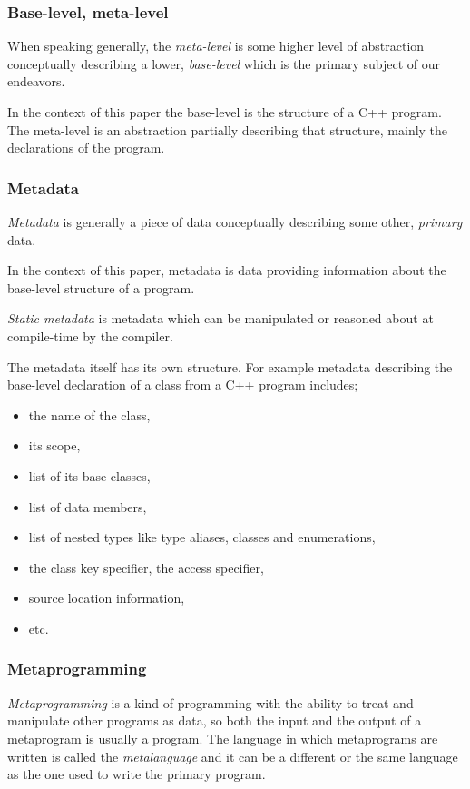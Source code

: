 \subsubsection{Base-level, meta-level}
\label{term-base-meta-level}

When speaking generally, the {\em meta-level} is some higher level of abstraction
conceptually describing a lower, {\em base-level} which is the primary subject
of our endeavors.

In the context of this paper the base-level is the structure of a C++ program.
The meta-level is an abstraction partially describing that structure,
mainly the declarations of the program.

\subsubsection{Metadata}
\label{term-metadata}

{\em Metadata} is generally a piece of data conceptually describing some other,
{\em primary} data.

In the context of this paper, metadata is data providing information
about the base-level structure of a program.

{\em Static metadata} is metadata which can be manipulated or reasoned
about at compile-time by the compiler.

The metadata itself has its own structure.
For example metadata describing the base-level declaration of a class 
from a C++ program includes;
\begin{itemize}
\item the name of the class,
\item its scope,
\item list of its base classes,
\item list of data members,
\item list of nested types like type aliases, classes and enumerations,
\item the class key specifier, the access specifier,
\item source location information,
\item etc.
\end{itemize}

\subsubsection{Metaprogramming}

{\em Metaprogramming} is a kind of programming with the ability to treat and
manipulate other programs as data, so both the input and the output of
a metaprogram is usually a program. The language in which metaprograms
are written is called the {\em metalanguage} and it can be a different or the
same language as the one used to write the primary program.


